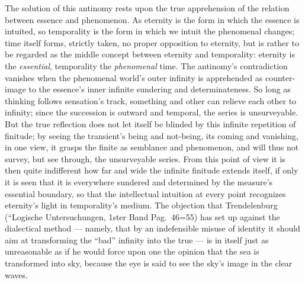 \documentclass[12pt]{book}
\begin{document}
The solution of this antinomy rests upon the true apprehension of the
relation between essence and phenomenon. As eternity is the form in which
the essence is intuited, so temporality is the form in which we intuit the
phenomenal changes; time itself forms, strictly taken, no proper opposition
to eternity, but is rather to be regarded as the middle concept between
eternity and temporality: eternity is the \emph{essential}, temporality the
\emph{phenomenal} time. The antinomy's contradiction vanishes when the
phenomenal world's outer infinity is apprehended as counter-image to the
essence's inner infinite sundering and determinateness. So long as thinking
follows sensation's track, something and other can relieve each other to
infinity; since the succession is outward and temporal, the series is
unsurveyable. But the true reflection does not let itself be blinded by this
infinite repetition of finitude; by seeing the transient's being and
not-being, its coming and vanishing, in one view, it grasps the finite as
semblance and phenomenon, and will thus not survey, but see through, the
unsurveyable series. From this point of view it is then quite indifferent
how far and wide the infinite finitude extends itself, if only it is seen
that it is everywhere sundered and determined by the measure's essential
boundary, so that the intellectual intuition at every point recognizes
eternity's light in temporality's medium. The objection that Trendelenburg
(``Logische Untersuchungen, 1ster Band Pag.\ 46=55) has set up against the
dialectical method --- namely, that by an indefensible misuse of identity it
should aim at transforming the ``bad'' infinity into the true --- is in
itself just as unreasonable as if he would force upon one the opinion that
the sea is transformed into sky, because the eye is said to see the sky's
image in the clear waves.
\end{document}
